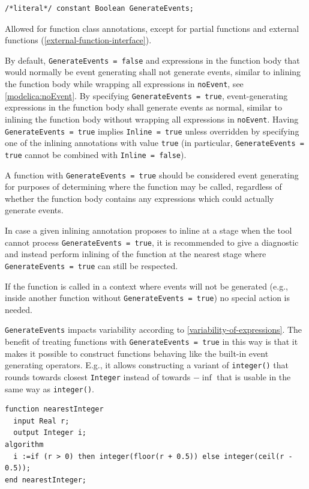 \begin{annotationdefinition}[GenerateEvents]
\begin{synopsis}\begin{lstlisting}
/*literal*/ constant Boolean GenerateEvents;
\end{lstlisting}\end{synopsis}
\begin{semantics}
Allowed for function class annotations, except for partial functions and external functions (\cref{external-function-interface}).

By default, {\lstinline!GenerateEvents = false!} and expressions in the function body that would normally be event generating shall not generate events, similar to inlining the function body while wrapping all expressions in {\lstinline!noEvent!}, see \cref{modelica:noEvent}.
By specifying {\lstinline!GenerateEvents = true!}, event-generating expressions in the function body shall generate events as normal, similar to inlining the function body without wrapping all expressions in {\lstinline!noEvent!}.
Having {\lstinline!GenerateEvents = true!} implies {\lstinline!Inline = true!} unless overridden by specifying one of the inlining annotations with value {\lstinline!true!} (in particular, {\lstinline!GenerateEvents = true!} cannot be combined with {\lstinline!Inline = false!}).

A function with \lstinline!GenerateEvents = true! should be considered event generating for purposes of determining where the function may be called, regardless of whether the function body contains any expressions which could actually generate events.

\begin{nonnormative}
In case a given inlining annotation proposes to inline at a stage when the tool cannot process {\lstinline!GenerateEvents = true!}, it is recommended to give a diagnostic and instead perform inlining of the function at the nearest stage where {\lstinline!GenerateEvents = true!} can still be respected.

If the function is called in a context where events will not be generated (e.g., inside another function without {\lstinline!GenerateEvents = true!}) no special action is needed.
\end{nonnormative}
\begin{example}
\lstinline!GenerateEvents! impacts variability according to \cref{variability-of-expressions}.
The benefit of treating functions with \lstinline!GenerateEvents = true! in this way is that it makes it possible to construct functions behaving like the built-in event generating operators.
E.g., it allows constructing a variant of \lstinline!integer()! that rounds towards closest \lstinline!Integer! instead of towards $-\inf$ that is usable in the same way as \lstinline!integer()!.
\begin{lstlisting}[language=modelica]
function nearestInteger
  input Real r;
  output Integer i;
algorithm
  i :=if (r > 0) then integer(floor(r + 0.5)) else integer(ceil(r - 0.5));
end nearestInteger;
\end{lstlisting}


\end{example}
\end{semantics}
\end{annotationdefinition}
